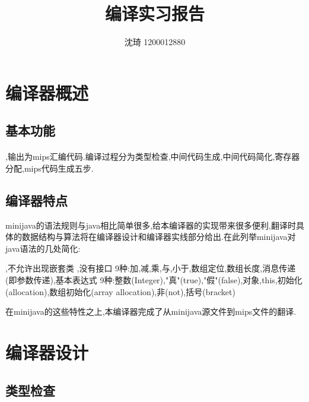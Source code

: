 \documentclass[11pt, oneside]{article}   	%
\title{编译实习报告}
\author{沈琦 1200012880}
\date{}							%
\begin{document}
\maketitle
\newpage
\tableofcontents
\begin{spacing}{1.55}
\section{编译器概述}
    \subsection{基本功能}
    \paragraph{}
    \indent{},输出为mips汇编代码.编译过程分为类型检查,中间代码生成,中间代码简化,寄存器分配,mips代码生成五步.
    \subsection{编译器特点}
	\indent\indent minijava的语法规则与java相比简单很多,给本编译器的实现带来很多便利,翻译时具体的数据结构与算法将在编译器设计和编译器实线部分给出.在此列举minijava对java语法的几处简化:
	\begin{enumerate}
		,不允许出现嵌套类
		,没有接口
		9种:加,减,乘,与,小于,数组定位,数组长度,消息传递(即参数传递),基本表达式
		9种:整数(Integer),"真"(true),"假"(false),对象,this,初始化(allocation),数组初始化(array allocation),非(not),括号(bracket)
	\end{enumerate}
	在minijava的这些特性之上,本编译器完成了从minijava源文件到mips文件的翻译.
\newpage
\section{编译器设计}
    \subsection{类型检查}

\end{spacing}
\end{document}
